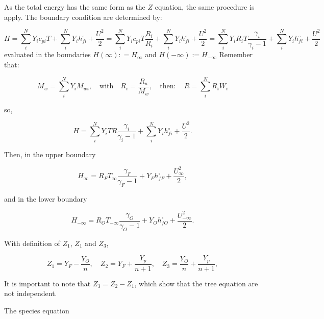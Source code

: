 As the total energy has the same 
form as the $Z$ equation, the same 
procedure is apply. The 
boundary condition are determined by:

\begin{equation}
    H
    =
    \sum_i^NY_ic_{pi}T
    +
    \sum_i^NY_ih_{fi}^{\circ }
    +
    \frac{U^{2}}{2}  
    =
    \sum_i^NY_ic_{pi}T
    \frac{R_i}{R_i}
    +
    \sum_i^NY_ih_{fi}^{\circ }
    +
    \frac{U^{2}}{2}  
    =
    \sum_i^NY_iR_iT
    \frac{\gamma_i}{\gamma_i-1}
    +
    \sum_i^NY_ih_{fi}^{\circ }
    +
    \frac{U^{2}}{2}  
\end{equation}
evaluated in the boundaries $H(\infty): =H_\infty$ and 
$H(-\infty):=H_{-\infty}$
Remember that:

\begin{equation}
M_w=\sum_i^NY_iM_{wi}, 
\quad
\text{with}
\quad
R_i=\frac{R_u}{M_w},
\quad
\text{then}:
\quad
R=\sum_i^NR_iW_i
\end{equation}

so,

\begin{equation}
    H
    =
    \sum_i^NY_iT
    R
    \frac{\gamma_i}{\gamma_i-1}
    +
    \sum_i^NY_ih_{fi}^{\circ }
    +
    \frac{U^{2}}{2}  
    .
\end{equation}

 Then, in the upper boundary

\begin{equation}
    H_\infty
    =
    R_FT_\infty
    \frac{\gamma_F}{\gamma_F-1}
    +
    Y_Fh_{fF}^{\circ }
    +
    \frac{U_\infty^{2}}{2}  
    , 
\end{equation}

and in the lower boundary

\begin{equation}
    H_{-\infty}
    =
    R_OT_{-\infty}
    \frac{\gamma_O}{\gamma_O-1} +
    Y_Oh_{fO}^{\circ }
    +
    \frac{U_{-\infty}^{2}}{2}  
    .
\end{equation}

With definition of $Z_1$, $Z_1$ and $Z_3$, 

\begin{equation}
   Z_1=Y_F-\frac{Y_O}{n}, 
   \quad
   Z_2=Y_F+\frac{Y_p}{n+1}, 
   \quad
   Z_3=\frac{Y_O}{n}+\frac{Y_p}{n+1}, 
\end{equation}

It is important to note that $Z_3=Z_2-Z_1$, which show that 
the tree equation are not independent.

The species equation 

